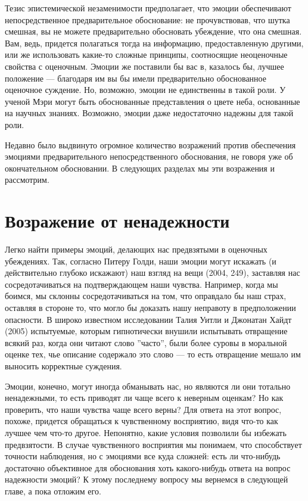 \documentclass[11pt]{book}
\begin{document}
Тезис эпистемической незаменимости предполагает, что эмоции обеспечивают непосредственное предварительное обоснование: не прочувствовав, что шутка смешная, вы не можете предварительно обосновать убеждение, что она смешная. Вам, ведь, придется полагаться тогда на информацию, предоставленную другими, или же использовать какие-то сложные принципы, соотносящие неоценочные свойства с оценочным. Эмоции же поставили бы вас в, казалось бы, лучшее положение --- благодаря им вы бы имели предварительно обоснованное оценочное суждение. Но, возможно, эмоции не единственны в такой роли. У ученой Мэри могут быть обоснованные представления о цвете неба, основанные на научных знаниях. Возможно, эмоции даже недостаточно надежны для такой роли.

Недавно было выдвинуто огромное количество возражений против обеспечения эмоциями предварительного непосредственного обоснования, не говоря уже об окончательном обосновании. В следующих разделах мы эти возражения и рассмотрим.

\section{Возражение от ненадежности}

Легко найти примеры эмоций, делающих нас предвзятыми в оценочных убеждениях. Так, согласно Питеру Голди, наши эмоции могут искажать (и действительно глубоко искажают) наш взгляд на вещи (2004, 249), заставляя нас сосредотачиваться на подтверждающем наши чувства. Например, когда мы боимся, мы склонны сосредотачиваться на том, что оправдало бы наш страх, оставляя в стороне то, что могло бы доказать нашу неправоту в предположении опасности. В широко известном исследовании Талия Уитли и Джонатан Хайдт (2005) испытуемые, которым гипнотически внушили испытывать отвращение всякий раз, когда они читают слово ''часто'', были более суровы в моральной оценке тех, чье описание содержало это слово --- то есть отвращение мешало им выносить корректные суждения.

Эмоции, конечно, могут иногда обманывать нас, но являются ли они тотально ненадежными, то есть приводят ли чаще всего к неверным оценкам? Но как проверить, что наши чувства чаще всего верны? Для ответа на этот вопрос, похоже, придется обращаться к чувственному восприятию, видя что-то как лучшее чем что-то другое. Непонятно, какие условия позволили бы избежать предвзятости. В случае чувственного восприятия мы понимаем, что способствует точности наблюдения, но с эмоциями все куда сложней: есть ли что-нибудь достаточно объективное для обоснования хоть какого-нибудь ответа на вопрос надежности эмоций? К этому последнему вопросу мы вернемся в следующей главе, а пока отложим его.
\end{document}
